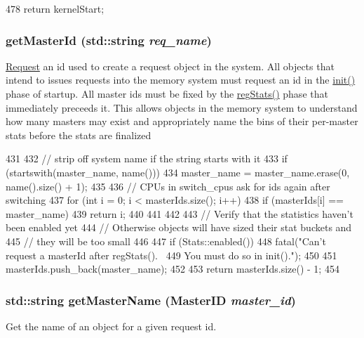 \begin{DoxyCode}
478 { return kernelStart; }
\end{DoxyCode}
\hypertarget{classSystem_a906e073613d8d8e76e11c1bf9310a25c}{
\subsubsection[{getMasterId}]{ getMasterId (std::string {\em req\_\-name})}}
\label{classSystem_a906e073613d8d8e76e11c1bf9310a25c}
\hyperlink{classRequest}{Request} an id used to create a request object in the system. All objects that intend to issues requests into the memory system must request an id in the \hyperlink{classSystem_a02fd73d861ef2e4aabb38c0c9ff82947}{init()} phase of startup. All master ids must be fixed by the \hyperlink{classSystem_a4dc637449366fcdfc4e764cdf12d9b11}{regStats()} phase that immediately preceeds it. This allows objects in the memory system to understand how many masters may exist and appropriately name the bins of their per-\/master stats before the stats are finalized 


\begin{DoxyCode}
431 {
432     // strip off system name if the string starts with it
433     if (startswith(master_name, name()))
434         master_name = master_name.erase(0, name().size() + 1);
435 
436     // CPUs in switch_cpus ask for ids again after switching
437     for (int i = 0; i < masterIds.size(); i++) {
438         if (masterIds[i] == master_name) {
439             return i;
440         }
441     }
442 
443     // Verify that the statistics haven't been enabled yet
444     // Otherwise objects will have sized their stat buckets and
445     // they will be too small
446 
447     if (Stats::enabled())
448         fatal("Can't request a masterId after regStats(). \
449                 You must do so in init().\n");
450 
451     masterIds.push_back(master_name);
452 
453     return masterIds.size() - 1;
454 }
\end{DoxyCode}
\hypertarget{classSystem_a810ce26f2e58138568d11cf179d6e89d}{
\subsubsection[{getMasterName}]{\setlength{\rightskip}{0pt plus 5cm}std::string getMasterName ({\bf MasterID} {\em master\_\-id})}}
\label{classSystem_a810ce26f2e58138568d11cf179d6e89d}
Get the name of an object for a given request id. 


